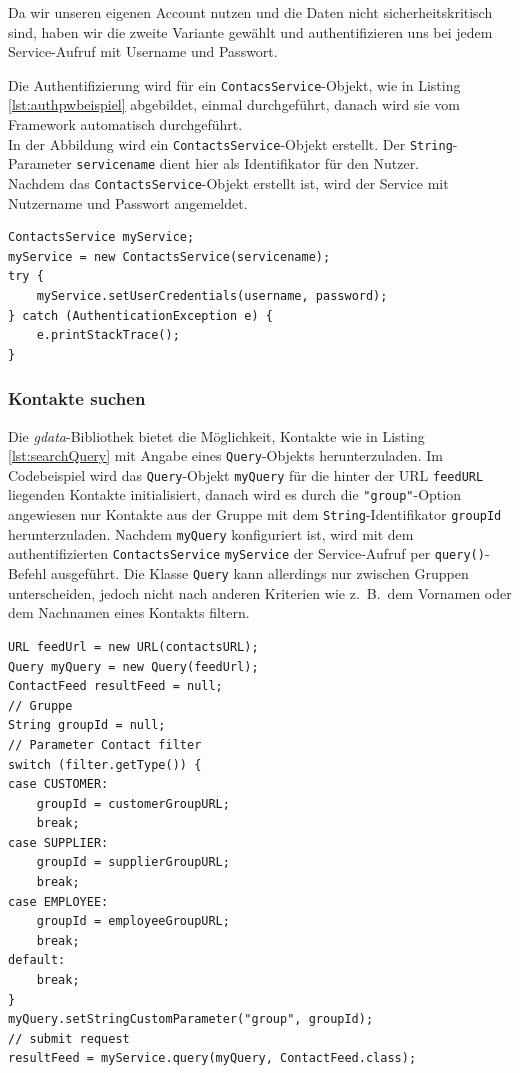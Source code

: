Da wir unseren eigenen Account nutzen und die Daten nicht sicherheitskritisch sind, haben
 wir die zweite Variante gew\"ahlt und authentifizieren uns bei jedem Service-Aufruf mit
 Username und Passwort.

Die Authentifizierung wird für ein \lstinline{ContacsService}-Objekt, wie in Listing
 \ref{lst:authpwbeispiel} abgebildet, einmal durchgeführt, danach wird sie vom Framework
 automatisch durchgeführt.
 \\
In der Abbildung wird ein \lstinline{ContactsService}-Objekt erstellt.
Der \lstinline{String}-Parameter \lstinline{servicename} dient hier als Identifikator für den Nutzer.
\\
Nachdem das \lstinline{ContactsService}-Objekt erstellt ist, wird der Service mit Nutzername und
 Passwort angemeldet.
 
\begin{lstlisting}[float=h!t]
ContactsService myService;
myService = new ContactsService(servicename);
try {
	myService.setUserCredentials(username, password);
} catch (AuthenticationException e) {
	e.printStackTrace();
}
\end{lstlisting}

\FloatBarrier
\subsubsection{Kontakte suchen}
Die \emph{gdata}-Bibliothek bietet die Möglichkeit, Kontakte wie in Listing \ref{lst:searchQuery}
 mit Angabe eines \lstinline{Query}-Objekts herunterzuladen.
Im Codebeispiel wird das \lstinline{Query}-Objekt \lstinline{myQuery} für die hinter der URL \lstinline{feedURL}
 liegenden Kontakte initialisiert, danach wird es durch die \lstinline{"group"}-Option angewiesen nur
 Kontakte aus der Gruppe mit dem \lstinline{String}-Identifikator \lstinline{groupId} herunterzuladen.
Nachdem \lstinline{myQuery} konfiguriert ist, wird mit dem authentifizierten \lstinline{ContactsService}
 \lstinline{myService} der Service-Aufruf per \lstinline{query()}-Befehl ausgeführt.
Die Klasse \lstinline{Query} kann allerdings nur zwischen Gruppen unterscheiden, jedoch nicht nach
 anderen Kriterien wie z.\ B.\ dem Vornamen oder dem Nachnamen eines Kontakts filtern.

\begin{lstlisting}[float=h!t]
URL feedUrl = new URL(contactsURL);
Query myQuery = new Query(feedUrl);
ContactFeed resultFeed = null;
// Gruppe
String groupId = null;
// Parameter Contact filter
switch (filter.getType()) {
case CUSTOMER:
	groupId = customerGroupURL;
	break;
case SUPPLIER:
	groupId = supplierGroupURL;
	break;
case EMPLOYEE:
	groupId = employeeGroupURL;
	break;
default:
	break;
}
myQuery.setStringCustomParameter("group", groupId);
// submit request
resultFeed = myService.query(myQuery, ContactFeed.class);
\end{lstlisting}


